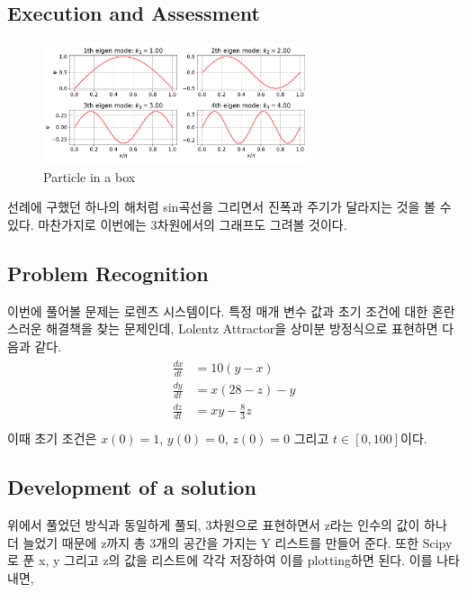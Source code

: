 \documentclass[11pt]{article}
\begin{document}
\subsection{Execution and Assessment}
\begin{figure}[!ht]
  \centering
  \includegraphics[width=0.7\textwidth]{particle.pdf}
  \caption{Particle in a box}
\end{figure}
선례에 구했던 하나의 해처럼 sin곡선을 그리면서 진폭과 주기가 달라지는 것을 볼 수 있다.
마찬가지로 이번에는 3차원에서의 그래프도 그려볼 것이다.











\subsection{Problem Recognition} 
이번에 풀어볼 문제는 로렌츠 시스템이다. 특정 매개 변수 값과 초기 조건에 대한 혼란스러운 해결책을 찾는 문제인데, Lolentz Attractor을 상미분 방정식으로 표현하면 다음과 같다.
\begin{equation}
\begin{split}
\begin{aligned}
\frac{dx}{dt} &= 10 (y - x) \\
\frac{dy}{dt} &= x  (28 - z) - y \\
\frac{dz}{dt} &= xy - \frac{8}{3} z \\
\end{aligned}
\end{split}
\end{equation}
이때 초기 조건은 $x(0) = 1$, $y(0) = 0$, $z(0) = 0$ 그리고 $t \in [0, 100]$이다.



\subsection{Development of a solution} 
위에서 풀었던 방식과 동일하게 풀되, 3차원으로 표현하면서 z라는 인수의 값이 하나 더 늘었기 때문에 z까지 총 3개의 공간을 가지는 Y 리스트를 만들어 준다. 또한 Scipy로 푼 x, y 그리고 z의 값을 리스트에 각각 저장하여 이를 plotting하면 된다. 이를 나타내면,
\end{document}

